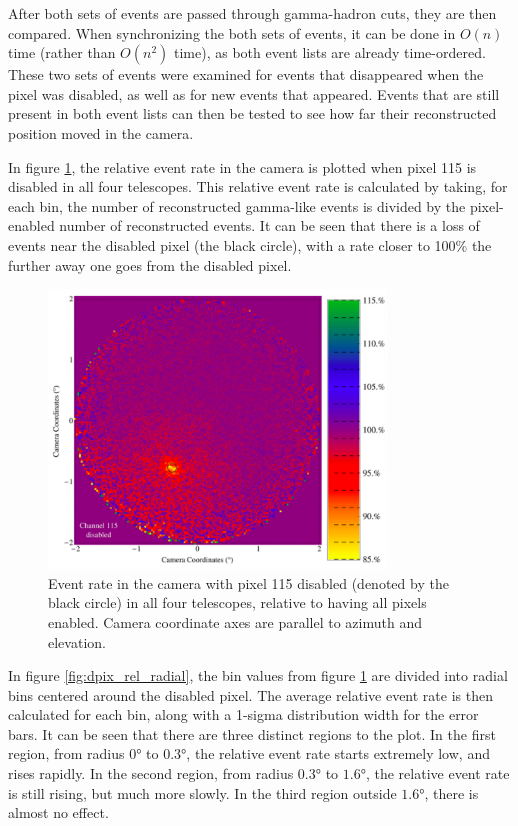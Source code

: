 After both sets of events are passed through gamma-hadron cuts, they are then compared.
When synchronizing the both sets of events, it can be done in $O\left(n\right)$ time (rather than $O\left(n^2\right)$ time), as both event lists are already time-ordered.
These two sets of events were examined for events that disappeared when the pixel was disabled, as well as for new events that appeared.
Events that are still present in both event lists can then be tested to see how far their reconstructed position moved in the camera.

In figure \ref{fig:dpix_rel_camera}, the relative event rate in the camera is plotted when pixel 115 is disabled in all four telescopes.
This relative event rate is calculated by taking, for each bin, the number of reconstructed gamma-like events is divided by the pixel-enabled number of reconstructed events.
It can be seen that there is a loss of events near the disabled pixel (the black circle), with a rate closer to 100\% the further away one goes from the disabled pixel.

\begin{figure}[ht]
  \begin{center}
    \includegraphics[width=0.8\textwidth]{images/disabled_pixel/relativerate_camera}
    \caption[Relative Event Rate]{Event rate in the camera with pixel 115 disabled (denoted by the black circle) in all four telescopes, relative to having all pixels enabled.  Camera coordinate axes are parallel to azimuth and elevation.}\label{fig:dpix_rel_camera}
  \end{center}
\end{figure}

In figure \ref{fig:dpix_rel_radial}, the bin values from figure \ref{fig:dpix_rel_camera} are divided into radial bins centered around the disabled pixel.
The average relative event rate is then calculated for each bin, along with a 1-sigma distribution width for the error bars.
It can be seen that there are three distinct regions to the plot.
In the first region, from radius $\ang{0}$ to $\ang{0.3}$, the relative event rate starts extremely low, and rises rapidly.
In the second region, from radius $\ang{0.3}$ to $\ang{1.6}$, the relative event rate is still rising, but much more slowly.
In the third region outside $\ang{1.6}$, there is almost no effect.


